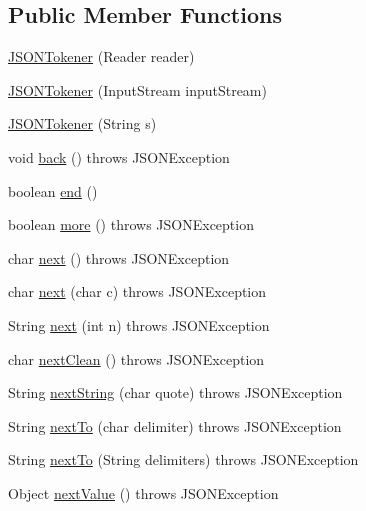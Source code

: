 \subsection*{Public Member Functions}
\begin{DoxyCompactItemize}
\item 
\hyperlink{classorg_1_1json_1_1JSONTokener_ab4cd37e4683e88bced2c8e0433bb31b4}{J\-S\-O\-N\-Tokener} (Reader reader)
\item 
\hyperlink{classorg_1_1json_1_1JSONTokener_a936053c6406cd75b0a7801d6e6de7108}{J\-S\-O\-N\-Tokener} (Input\-Stream input\-Stream)
\item 
\hyperlink{classorg_1_1json_1_1JSONTokener_ab56cccc925fc2b4042af4b0d3de6a874}{J\-S\-O\-N\-Tokener} (String s)
\item 
void \hyperlink{classorg_1_1json_1_1JSONTokener_aa2eafdef7304777a457f3e66cc0e668b}{back} ()  throws J\-S\-O\-N\-Exception 
\item 
boolean \hyperlink{classorg_1_1json_1_1JSONTokener_a767d3f6c8313e03bc3dfb4fdc495294c}{end} ()
\item 
boolean \hyperlink{classorg_1_1json_1_1JSONTokener_afb0edb7fd38ed9c55470055d46aedd3a}{more} ()  throws J\-S\-O\-N\-Exception 
\item 
char \hyperlink{classorg_1_1json_1_1JSONTokener_ae129753dbe43ea50aa34e3c06773fdfb}{next} ()  throws J\-S\-O\-N\-Exception 
\item 
char \hyperlink{classorg_1_1json_1_1JSONTokener_a3525fe5f3f7767e7130fbe65de1d811e}{next} (char c)  throws J\-S\-O\-N\-Exception 
\item 
String \hyperlink{classorg_1_1json_1_1JSONTokener_a79e7c90c5b0ad4b83113c6df5834d2e8}{next} (int n)  throws J\-S\-O\-N\-Exception 
\item 
char \hyperlink{classorg_1_1json_1_1JSONTokener_ad675aa7419ea153d54a72e1fced1e08f}{next\-Clean} ()  throws J\-S\-O\-N\-Exception 
\item 
String \hyperlink{classorg_1_1json_1_1JSONTokener_af5622e7beb53a5290a7e18f8b8111ee5}{next\-String} (char quote)  throws J\-S\-O\-N\-Exception 
\item 
String \hyperlink{classorg_1_1json_1_1JSONTokener_a6d2f6ecc7488657d6a49ff27861599d4}{next\-To} (char delimiter)  throws J\-S\-O\-N\-Exception 
\item 
String \hyperlink{classorg_1_1json_1_1JSONTokener_a4db4f33d395593dacff7852feb51b9ae}{next\-To} (String delimiters)  throws J\-S\-O\-N\-Exception 
\item 
Object \hyperlink{classorg_1_1json_1_1JSONTokener_a9a139d1ce942c4693ca7268567b7def3}{next\-Value} ()  throws J\-S\-O\-N\-Exception 

\end{DoxyCompactItemize}
